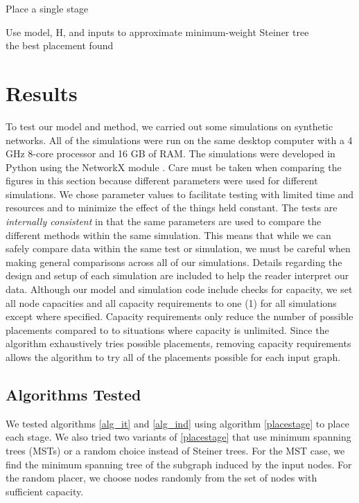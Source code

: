 \documentclass{acmart}
\begin{document}
	\begin{algorithm}
	\caption{Place a single stage}\label{placestage}
	\begin{algorithmic}[1]
	                \State Use model, H, and inputs to approximate minimum-weight Steiner tree
	            \EndIf
	        \EndFor \\
	        \Return the best placement found 
	    \EndProcedure
	\end{algorithmic}
	\end{algorithm}
	
	\section{Results}
	To test our model and method, we carried out some simulations on synthetic networks. All of the simulations were run on the same desktop computer with a 4 GHz 8-core processor and 16 GB of RAM. The simulations were developed in Python using the NetworkX module \cite{Hagberg2008ExploringNS}.
	Care must be taken when comparing the figures in this section because different parameters were used for different simulations. We chose parameter values to facilitate testing with limited time and resources and to minimize the effect of the things held constant. The tests are \textit{internally consistent} in that the same parameters are used to compare the different methods within the same simulation. This means that while we can safely compare data within the same test or simulation, we must be careful when making general comparisons across all of our simulations. Details regarding the design and setup of each simulation are included to help the reader interpret our data. Although our model and simulation code include checks for capacity, we set all node capacities and all capacity requirements to one (1) for all simulations except where specified. Capacity requirements only reduce the number of possible placements compared to to situations where capacity is unlimited. Since the algorithm exhaustively tries possible placements, removing capacity requirements allows the algorithm to try all of the placements possible for each input graph.
	
	\subsection{Algorithms Tested}
	We tested algorithms \ref{alg_it} and \ref{alg_ind} using algorithm \ref{placestage} to place each stage. We also tried two variants of \ref{placestage} that use minimum spanning trees (MSTs) or a random choice instead of Steiner trees. For the MST case, we find the minimum spanning tree of the subgraph induced by the input nodes. For the random placer, we choose nodes randomly from the set of nodes with sufficient capacity.
	
\end{document}
